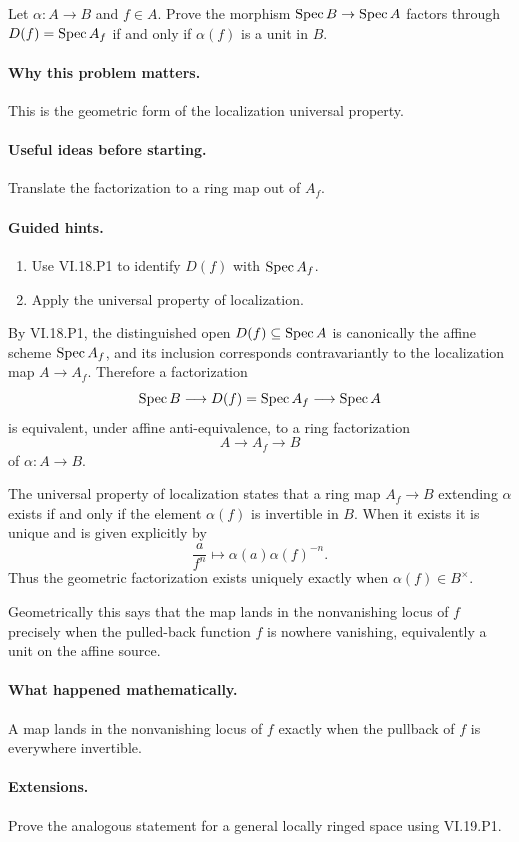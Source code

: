 \begin{problem}\label{prob:vi19-p16}
Let $\alpha:A\to B$ and $f\in A$. Prove the morphism $\operatorname{Spec} B\to\operatorname{Spec} A$ factors through $D(f)=\operatorname{Spec} A_f$ if and only if $\alpha(f)$ is a unit in $B$.
\end{problem}

\ifdefined\FullProblemDossiers
\paragraph{Why this problem matters.}
This is the geometric form of the localization universal property.

\paragraph{Useful ideas before starting.}
Translate the factorization to a ring map out of $A_f$.

\paragraph{Guided hints.}
\begin{enumerate}
\item Use VI.18.P1 to identify $D(f)$ with $\operatorname{Spec} A_f$.
\item Apply the universal property of localization.
\end{enumerate}

\begin{solution}
By VI.18.P1, the distinguished open \(D(f)\subseteq\operatorname{Spec} A\) is canonically the affine scheme \(\operatorname{Spec} A_f\), and its inclusion corresponds contravariantly to the localization map \(A\to A_f\).  Therefore a factorization
\[
\operatorname{Spec} B\longrightarrow D(f)=\operatorname{Spec} A_f\longrightarrow\operatorname{Spec} A
\]
is equivalent, under affine anti-equivalence, to a ring factorization
\[
A\longrightarrow A_f\longrightarrow B
\]
of \(\alpha:A\to B\).

The universal property of localization states that a ring map \(A_f\to B\) extending \(\alpha\) exists if and only if the element \(\alpha(f)\) is invertible in \(B\).  When it exists it is unique and is given explicitly by
\[
\frac a{f^n}\longmapsto\alpha(a)\alpha(f)^{-n}.
\]
Thus the geometric factorization exists uniquely exactly when \(\alpha(f)\in B^\times\).

Geometrically this says that the map lands in the nonvanishing locus of \(f\) precisely when the pulled-back function \(f\) is nowhere vanishing, equivalently a unit on the affine source.
\end{solution}

\paragraph{What happened mathematically.}
A map lands in the nonvanishing locus of $f$ exactly when the pullback of $f$ is everywhere invertible.

\paragraph{Extensions.}
Prove the analogous statement for a general locally ringed space using VI.19.P1.
\fi
